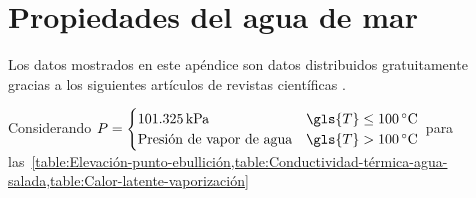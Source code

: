 %
%
%

\chapter{Propiedades del agua de mar}\label{ch:seawater-properties}

Los datos mostrados en este apéndice son datos distribuidos gratuitamente  gracias a los siguientes artículos de revistas científicas \cites{nayar_thermophysical_2016}{sharqawy_thermophysical_2010}.

	Considerando \(
		P = \begin{cases}
			\qty{101.325}{\kilo\pascal} & \gls{T} \leq \qty{100}{\degreeCelsius} \\
			\text{Presión de vapor de agua} & \gls{T} > \qty{100}{\degreeCelsius} \\
		\end{cases}
	\) para las~\cref{table:Elevación-punto-ebullición,table:Conductividad-térmica-agua-salada,table:Calor-latente-vaporización}

